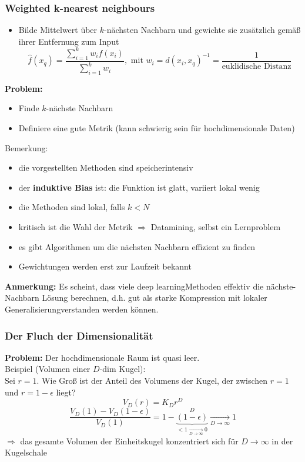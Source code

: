 	\subsubsection{Weighted k-nearest neighbours}
	\begin{itemize}
		\item Bilde Mittelwert über $k$-nächsten Nachbarn und gewichte sie zusätzlich gemäß ihrer Entfernung zum Input
		\begin{equation*}
			\hat{f}(x_q) = \frac{\sum_{i=1}^k w_if(x_i)}{\sum_{i=1}^k w_i}, \text{ mit } w_i = d(x_i,x_q)^{-1} = \frac{1}{\text{euklidische Distanz}}
		\end{equation*}
	\end{itemize}
	\textbf{Problem:}
	\begin{itemize}
		\item Finde $k$-nächste Nachbarn
		\item Definiere eine gute Metrik (kann schwierig sein für hochdimensionale Daten)
	\end{itemize}
	Bemerkung:
	\begin{itemize}
		\item die vorgestellten Methoden sind speicherintensiv
		\item der \textbf{induktive Bias} ist: die Funktion ist glatt, variiert lokal wenig
		\item die Methoden sind lokal, falls $k<N$
		\item kritisch ist die Wahl der Metrik $\Rightarrow$ Datamining, selbst ein Lernproblem
		\item es gibt Algorithmen um die nächsten Nachbarn effizient zu finden
		\item Gewichtungen werden erst zur Laufzeit bekannt
	\end{itemize}
	\textbf{Anmerkung:} Es scheint, dass viele \dq deep learning\dq Methoden effektiv die nächste-Nachbarn Lösung berechnen, d.h. gut als \dq starke Kompression mit lokaler Generalisierung\dq verstanden werden können.
	\subsubsection{Der Fluch der Dimensionalität}
	\textbf{Problem:} Der hochdimensionale Raum ist quasi \dq leer\dq.\\[5pt]
	Beispiel (Volumen einer $D$-dim Kugel):\\[5pt]
	Sei $r=1$. Wie Groß ist der Anteil des Volumens der Kugel, der zwischen $r=1$ und $r=1-\epsilon$ liegt?
	\begin{equation*}
		V_D(r) = K_Dr^D
	\end{equation*}
	\begin{equation*}
		\frac{V_D(1)-V_D(1-\epsilon)}{V_D(1)} = 1 - \underbrace{(1-\epsilon)}_{<1\underset{D\rightarrow \infty}{\rightarrow}  0}^D \underset{D\rightarrow \infty}{\rightarrow} 1
	\end{equation*}
	$\Rightarrow$ das gesamte Volumen der Einheitskugel konzentriert sich für $D \rightarrow \infty$ in der Kugelschale
